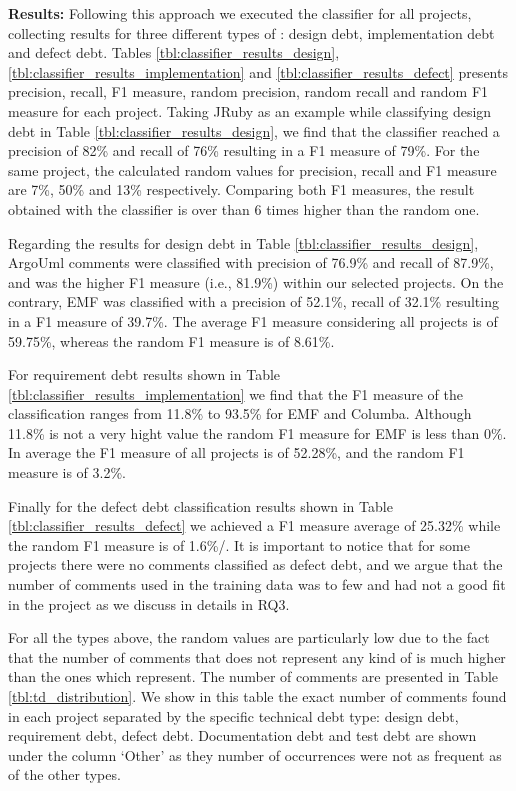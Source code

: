 \vspace{1mm}
\noindent \textbf{Results:} Following this approach we executed the classifier for all projects, collecting results for three different types of \SATD: design debt, implementation debt and defect debt. Tables \ref{tbl:classifier_results_design}, \ref{tbl:classifier_results_implementation} and \ref{tbl:classifier_results_defect} presents precision, recall, F1 measure, random precision, random recall and random F1 measure for each project. Taking JRuby as an example while classifying design debt in Table \ref{tbl:classifier_results_design}, we find that the classifier reached a precision of 82\% and recall of 76\% resulting in a F1 measure of 79\%. For the same project, the calculated random values for precision, recall and F1 measure are 7\%, 50\% and 13\% respectively. Comparing both F1 measures, the result obtained with the classifier is over than 6 times higher than the random one.

Regarding the results for design debt in Table \ref{tbl:classifier_results_design}, ArgoUml \SATD comments were classified with precision of 76.9\% and recall of 87.9\%, and was the higher F1 measure (i.e., 81.9\%) within our selected projects. On the contrary, EMF was classified with a precision of 52.1\%, recall of 32.1\% resulting in a F1 measure of 39.7\%. The average F1 measure considering  all projects is of 59.75\%, whereas the random F1 measure is of 8.61\%. 

For requirement debt results shown in Table \ref{tbl:classifier_results_implementation} we find that the F1 measure of the classification ranges from 11.8\% to 93.5\% for EMF and Columba. Although 11.8\% is not a very hight value the random F1 measure for EMF is less than 0\%. In average the F1 measure of all projects is of 52.28\%, and the random F1 measure is of 3.2\%. 

Finally for the defect debt classification results shown in Table \ref{tbl:classifier_results_defect} we achieved a F1 measure average of 25.32\% while the random F1 measure is of 1.6\%/. It is important to notice that for some projects there were no \SATD comments classified as defect debt, and we argue that the number of comments used in the training data was to few and had not a good fit in the project as we discuss in details in RQ3.

For all the types above, the random values are particularly low due to the fact that the number of comments that does not represent any kind of \SATD is much higher than the ones which represent. The number of \SATD comments are presented in Table \ref{tbl:td_distribution}. We show in this table the exact number of \SATD comments found in each project separated by the specific technical debt type: design debt, requirement debt, defect debt. Documentation debt and test debt are shown under the column `Other' as they number of occurrences were not as frequent as of the other types. 


